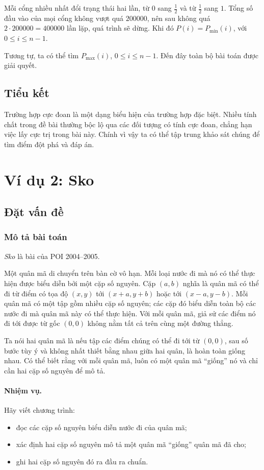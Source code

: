 \documentclass[11pt]{article}
\begin{document}
Mỗi cổng nhiều nhất đổi trạng thái hai lần, từ \(0\) sang \(\frac12\) và từ
\(\frac12\) sang \(1\). Tổng số đầu vào của mọi cổng không vượt quá
\(200000\), nên sau không quá \(2\cdot 200000=400000\) lần lặp, quá trình sẽ
dừng. Khi đó \(P(i)=P_{\min}(i)\), với \(0\le i\le n-1\).

Tương tự, ta có thể tìm \(P_{\max}(i)\), \(0\le i\le n-1\). Đến đây toàn bộ
bài toán được giải quyết.

\subsection{Tiểu kết}

Trường hợp cực đoan là một dạng biểu hiện của trường hợp đặc biệt. Nhiều tính
chất trong đề bài thường bộc lộ qua các đối tượng có tính cực đoan, chẳng hạn
việc lấy cực trị trong bài này. Chính vì vậy ta có thể tập trung khảo sát
chúng để tìm điểm đột phá và đáp án.

\section{Ví dụ 2: Sko}

\subsection{Đặt vấn đề}

\subsubsection{Mô tả bài toán}

\textit{Sko} là bài của POI 2004--2005.

Một quân mã di chuyển trên bàn cờ vô hạn. Mỗi loại nước đi mà nó có thể thực
hiện được biểu diễn bởi một cặp số nguyên. Cặp \((a,b)\) nghĩa là quân mã có
thể đi từ điểm có tọa độ \((x,y)\) tới \((x+a,y+b)\) hoặc tới
\((x-a,y-b)\). Mỗi quân mã có một tập gồm nhiều cặp số nguyên; các cặp đó biểu
diễn toàn bộ các nước đi mà quân mã này có thể thực hiện. Với mỗi quân mã, giả
sử các điểm nó đi tới được từ gốc \((0,0)\) không nằm tất cả trên cùng một
đường thẳng.

Ta nói hai quân mã là  nếu tập các điểm chúng có thể đi tới
từ \((0,0)\), sau số bước tùy ý và không nhất thiết bằng nhau giữa hai quân,
là hoàn toàn giống nhau. Có thể biết rằng với mỗi quân mã, luôn có một quân mã
``giống'' nó và chỉ cần hai cặp số nguyên để mô tả.

\paragraph{Nhiệm vụ.}
Hãy viết chương trình:
\begin{itemize}
  \item đọc các cặp số nguyên biểu diễn nước đi của quân mã;
  \item xác định hai cặp số nguyên mô tả một quân mã ``giống'' quân mã đã cho;
  \item ghi hai cặp số nguyên đó ra đầu ra chuẩn.
\end{itemize}
\end{document}
